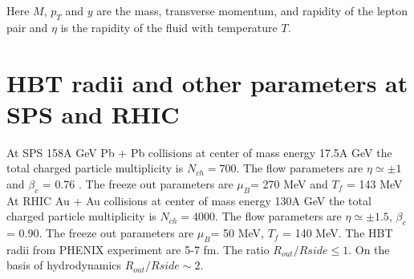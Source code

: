 Here $M$, $p_T$ and $y$ are the mass, transverse momentum,
and  rapidity of the lepton pair and $\eta$ is the rapidity
of the fluid with temperature $T$.



\section{HBT radii and other parameters at SPS and RHIC}

At SPS 158A GeV Pb + Pb collisions at center of mass energy 
17.5A GeV the total charged particle multiplicity is 
$N_{ch}= 700$. The flow parameters are $\eta \simeq \pm 1$ and
$\beta_c$ = 0.76 \cite{LET}. The freeze out parameters are
$\mu_B$= 270 MeV  and $T_f$ = 143 MeV \\

At RHIC Au + Au collisions at center of mass energy 
130A GeV the total charged particle multiplicity is 
$N_{ch}= 4000$. The flow parameters are $\eta \simeq \pm 1.5$,
$\beta_c$ = 0.90. The freeze out parameters are
$\mu_B$= 50 MeV, $T_f$ = 140 MeV.
The HBT radii from PHENIX experiment \cite{PHEN} are 5-7 fm.
The ratio $R_{out}/R{side} \leq 1$. 
On the basis of hydrodynamics $R_{out}/R{side} \sim 2$.
\ \\

\newpage

\begin{figure}
\centerline{}
\caption{}
\label{photon}
\end{figure}

\begin{figure}
\centerline{}
\caption{}
\label{photon}
\end{figure}


